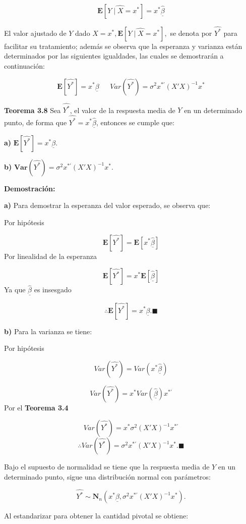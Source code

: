 \documentclass[
  a4paper,
  oneside,
  openany]{book}
\begin{document}
\[\mathbf{E}\left[\widehat{Y \mid X =} x^*\right]=x^*\underline{\hat{\beta}}\]

El valor ajustado de \(Y\) dado \(X=x^*,\mathbf{E}\left[ \widehat{Y \mid X=} x^*\right],\) se denota por \(\hat{Y^*}\) para facilitar su tratamiento; además se observa que la esperanza y varianza están determinados por las siguientes igualdades, las cuales se demostrarán a continuación:

\[\mathbf{E}[\hat{Y^*}]= x^*\underline{\beta} \ \ \ \ \ \ \ Var(\hat{Y^*})=\sigma^2 x^{*'}(X'X)^{-1}x^*\]

\textbf{Teorema 3.8} Sea \(\hat{Y^*}\), el valor de la respuesta media de \(Y\) en un determinado punto, de forma que \(\hat{Y^*}=x^*\underline{\hat{\beta}}\), entonces se cumple que:

\textbf{a)} \(\mathbf{E}[\hat{Y^*}]= x^*\underline{\beta}.\)

\textbf{b)} \(\textbf{Var}(\hat{Y^*})=\sigma^2 x^{*'}(X'X)^{-1}x^*.\)

\textbf{Demostración:}

\textbf{a)} Para demostrar la esperanza del valor esperado, se observa que:

Por hipótesis

\[\mathbf{E}[\hat{Y^*}]=\mathbf{E}[x^*\underline{\hat{\beta}}]\]
Por linealidad de la esperanza

\[\mathbf{E}[\hat{Y^*}]=x^*\mathbf{E}[\underline{\hat{\beta}}]\]
Ya que \(\underline{\hat{\beta}}\) es insesgado

\[\therefore \mathbf{E}[\hat{Y^*}]= x^*\underline{\beta}.\blacksquare\]

\textbf{b)} Para la varianza se tiene:

Por hipótesis

\[Var(\hat{Y^*})=Var(x^*\underline{\hat{\beta}})\]

\[Var(\hat{Y^*})=x^*Var(\underline{\hat{\beta}})x^{*'}\]
Por el \textbf{Teorema 3.4}

\[Var(\hat{Y^*})=x^*\sigma^2(X'X)^{-1}x^{*'}\]
\[\therefore Var(\hat{Y^*})=\sigma^2 x^{*'}(X'X)^{-1}x^*.\blacksquare\]

Bajo el supuesto de normalidad se tiene que la respuesta media de \(Y\) en un determinado punto, sigue una distribución normal con parámetros:

\[\hat{Y^*} \sim \mathbf{N}_{n}\left(x^*\underline{\beta} ,\sigma^2 x^{*'}(X'X)^{-1}x^*\right).\]

Al estandarizar para obtener la cantidad pivotal se obtiene:
\end{document}
